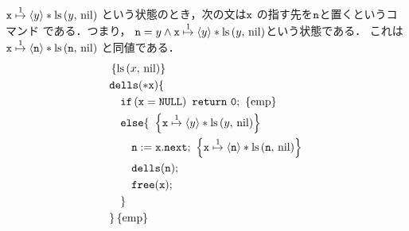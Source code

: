 \documentclass[a4paper, 10pt]{ltjsarticle}
\begin{document}
  $ \mathtt{x} \mathrel{\overset{1}{\mapsto}} \left\langle y \right\rangle * \mathop{\mathrm{ls}}\left(y{,}\ \mathrm{nil}\right)$
  という状態のとき，次の文は$\mathtt{x}$
  の指す先を$\mathtt{n}$と置くというコマンド
  である．つまり，
  $\mathtt{n}=y \land  \mathtt{x} \mathrel{\overset{1}{\mapsto}} \left\langle y \right\rangle * \mathop{\mathrm{ls}}\left(y{,}\ \mathrm{nil}\right)$という状態である．
  これは
  $ \mathtt{x} \mathrel{\overset{1}{\mapsto}} \left\langle \mathtt{n} \right\rangle * \mathop{\mathrm{ls}}\left(\mathtt{n}{,}\ \mathrm{nil}\right)$
  と同値である．
    \begin{align*}
   &  \left\{\mathprls{x}{\mathvalnil}\right\}\\
   & \mathprogramsy{dells(*x)} \{  \\
   &\quad \mathprogramsy{if\left(x = NULL\right)\ return\ 0;}\ \left\{\mathemp\right\}
   \\
     &\quad   \mathprogramsy{else \{}\  
   \left\{ \mathprogramsy{x} \mathpointer{1} \left\langle y \right\rangle * \mathprls{y}{\mathvalnil}  \right\} \\
     &\qquad  \mathprogramsy{n := x.next;}\  \left\{ \mathprogramsy{x} \mathpointer{1} \left\langle \mathprogramsy{n} \right\rangle * \mathprls{\mathprogramsy{n}}{\mathvalnil}  \right\} \\
     &\qquad  \mathprogramsy{dells(n);}  %
   \\
      &\qquad  \mathprogramsy{free(x);}   %
   \\
      &\quad \mathprogramsy{\}} %
   \\
      &\mathprogramsy{\}} \left\{\mathemp\right\}
    \end{align*}
  
\end{document}
